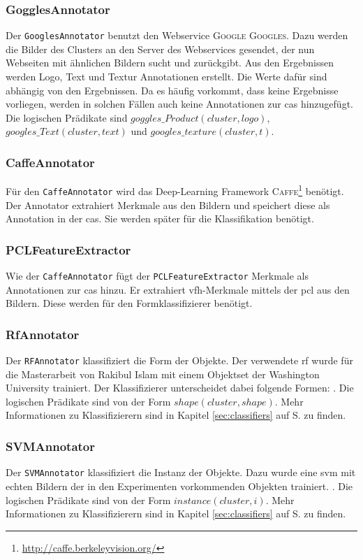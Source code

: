 \subsubsection{GogglesAnnotator}
Der \texttt{GooglesAnnotator} benutzt den Webservice \textsc{Google Googles}. Dazu werden die Bilder des Clusters an den Server des Webservices gesendet, der nun Webseiten mit ähnlichen Bildern sucht und zurückgibt. Aus den Ergebnissen werden Logo, Text und Textur Annotationen erstellt. Die Werte dafür sind abhängig von den Ergebnissen. Da es häufig vorkommt, dass keine Ergebnisse vorliegen, werden in solchen Fällen auch keine Annotationen zur \gls{cas} hinzugefügt. Die logischen Prädikate sind $goggles\_Product(cluster, logo)$, $googles\_Text(cluster, text)$ und $googles\_texture(cluster, t)$. 

\subsubsection{CaffeAnnotator}
Für den \texttt{CaffeAnnotator} wird das Deep-Learning Framework \textsc{Caffe}\footnote{\url{http://caffe.berkeleyvision.org/}} benötigt. Der Annotator extrahiert Merkmale aus den Bildern und speichert diese als Annotation in der \gls{cas}. Sie werden später für die Klassifikation benötigt.  

\subsubsection{PCLFeatureExtractor}
Wie der \texttt{CaffeAnnotator} fügt der \texttt{PCLFeatureExtractor} Merkmale als Annotationen zur \gls{cas} hinzu. Er extrahiert \gls{vfh}-Merkmale mittels der \gls{pcl} aus den Bildern. Diese werden für den Formklassifizierer benötigt.

\subsubsection{RfAnnotator}
 Der \texttt{RFAnnotator} klassifiziert die Form der Objekte. Der verwendete \gls{rf} wurde für die Masterarbeit von Rakibul Islam \cite{rakib} mit einem Objektset der Washington University trainiert. Der Klassifizierer unterscheidet dabei folgende Formen: . Die logischen Prädikate sind von der Form  $shape(cluster, shape)$. Mehr Informationen zu Klassifizierern sind in Kapitel \ref{sec:classifiers} auf S. \pageref{sec:classifiers} zu finden.

\subsubsection{SVMAnnotator}
 Der \texttt{SVMAnnotator} klassifiziert die Instanz der Objekte. Dazu wurde eine \gls{svm} mit echten Bildern  der in den Experimenten vorkommenden Objekten trainiert. . Die logischen Prädikate sind von der Form  $instance(cluster, i)$. Mehr Informationen zu Klassifizierern sind in Kapitel \ref{sec:classifiers} auf S. \pageref{sec:classifiers} zu finden.

